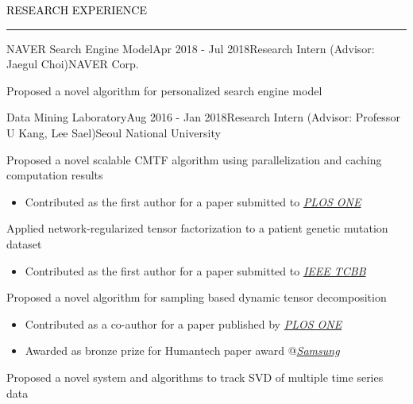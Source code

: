 \documentclass{resume} %
\renewenvironment{rSection}[1]{
	\sectionskip
	\textcolor{Black}{\MakeUppercase{#1}}
	\sectionlineskip
	\hrule
	\begin{list}{}{
			\setlength{\leftmargin}{1.5em}
		}
		\item[]
	}{
	\end{list}
}
\begin{document}
\vspace*{-2.0mm}
\begin{rSection}{Research Experience}
\begin{rSubsection}{NAVER Search Engine Model}{Apr 2018 - Jul 2018}{Research Intern (Advisor: Jaegul Choi)}{NAVER Corp.}
	\item Proposed a novel algorithm for personalized search engine model
\end{rSubsection}	
\vspace*{-2.5mm}
\begin{rSubsection}{Data Mining Laboratory}{Aug 2016 - Jan 2018}{Research Intern (Advisor: Professor U Kang, Lee Sael)}{Seoul National University}
	\item Proposed a novel scalable CMTF algorithm using parallelization and caching computation results
	\begin{itemize}
		\vspace*{-2.5mm}
		\item Contributed as the first author for a paper submitted to \href{https://journals.plos.org/plosone/}{\textit{PLOS ONE}}
	\end{itemize}
	\item Applied network-regularized tensor factorization to a patient genetic mutation dataset
	\begin{itemize}
		\vspace*{-2.0mm}
		\item Contributed as the first author for a paper submitted to \href{https://www.computer.org/web/tcbb}{\textit{IEEE TCBB}}
	\end{itemize}
	\item Proposed a novel algorithm for sampling based dynamic tensor decomposition
	\begin{itemize}
		\vspace*{-2.0mm}
		\item Contributed as a co-author for a paper published by \href{http://journals.plos.org/plosone/}{\textit{PLOS ONE}}
		\vspace*{-2.0mm}
		\item Awarded as bronze prize for Humantech paper award @\em{\href{https://humantech.samsung.com/saitext/index.jsp}{Samsung}}\em
	\end{itemize}
	\item Proposed a novel system and algorithms to track SVD of multiple time series data
	\begin{itemize}
		\vspace*{-2.0mm}

\end{itemize}
\end{rSubsection}
\end{rSection}
\end{document}
